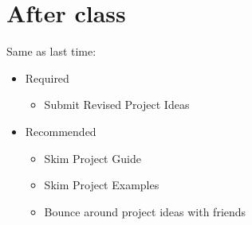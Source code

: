 \documentclass[11pt]{article}
\begin{document}
\section*{After class}


Same as last time:
\begin{itemize}
\item Required
\begin{itemize}
\item Submit Revised Project Ideas
\end{itemize}
\item Recommended
\begin{itemize}
\item Skim Project Guide
\item Skim Project Examples
\item Bounce around project ideas with friends
\end{itemize}
\end{itemize}



\end{document}

